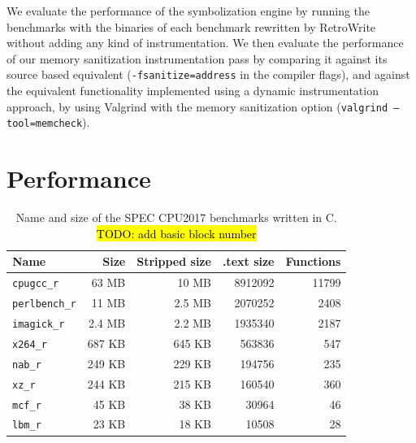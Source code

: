 \documentclass[a4paper,11pt,oneside]{report}
\newcommand{\sysname}{RetroWrite\xspace}
\DeclareRobustCommand{\todo}[1]{{\sethlcolor{cyan}\hl{TODO: #1}}}
\begin{document}
We evaluate the performance of the symbolization engine by running the
benchmarks with the binaries of each benchmark rewritten by \sysname without
adding any kind of instrumentation. We then evaluate the performance of our
memory sanitization instrumentation pass by comparing it against its source
based equivalent (\texttt{-fsanitize=address} in the compiler flags), and
against the equivalent functionality implemented using a dynamic
instrumentation approach, by using Valgrind with the memory sanitization option
(\texttt{valgrind --tool=memcheck}).


\section{Performance}




\begin{table}
\centering
\begin{tabular}{lrrrr}
\toprule
	\textbf{Name} & \textbf{Size} & \textbf{Stripped size} &  \textbf{.text size} & \textbf{Functions} \\
\toprule
	\texttt{cpugcc\_r   }              & 63 MB  & 10 MB  & 8912092 & 11799 \\
	\texttt{perlbench\_r} \hspace{2em} & 11 MB  & 2.5 MB & 2070252 & 2408  \\
	\texttt{imagick\_r  }              & 2.4 MB & 2.2 MB & 1935340 & 2187  \\
	\texttt{x264\_r }                  & 687 KB & 645 KB & 563836  & 547   \\
	\texttt{nab\_r      }              & 249 KB & 229 KB & 194756  & 235   \\
	\texttt{xz\_r   }                  & 244 KB & 215 KB & 160540  & 360   \\
	\texttt{mcf\_r      }              & 45 KB  & 38 KB  & 30964   & 46    \\
	\texttt{lbm\_r      }              & 23 KB  & 18 KB  & 10508   & 28    \\
\bottomrule
\end{tabular}
	\caption{Name and size of the SPEC CPU2017 benchmarks written in C. \todo{add basic block number}}
\label{tabularasa}
\end{table}
\end{document}
